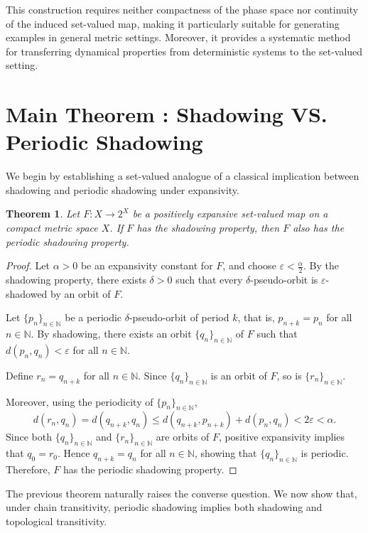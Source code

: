 \documentclass{amsart}
\newtheorem{theorem}{Theorem}[section]
\theoremstyle{definition}
\begin{document}
This construction requires neither compactness of the phase space nor continuity of the induced set-valued map, making it particularly suitable for generating examples in general metric settings. Moreover, it provides a systematic method for transferring dynamical properties from deterministic systems to the set-valued setting.



\section{Main Theorem : Shadowing VS. Periodic Shadowing}

We begin by establishing a set-valued analogue of a classical implication between shadowing and periodic shadowing under expansivity.

\begin{theorem}    
\label{theoremA}
Let $F:X\to 2^X$ be a positively expansive set-valued map on a compact metric space $X$. If $F$ has the shadowing property, then $F$ also has the periodic shadowing property.
\end{theorem}

\begin{proof}
Let $\alpha>0$ be an expansivity constant for $F$, and choose $\varepsilon<\frac{\alpha}{2}$. By the shadowing property, there exists $\delta>0$ such that every $\delta$-pseudo-orbit is $\varepsilon$-shadowed by an orbit of $F$.

Let $\{p_n\}_{n\in\mathbb N}$ be a periodic $\delta$-pseudo-orbit of period $k$, that is, $p_{n+k}=p_n$ for all $n\in\mathbb N$. 
By shadowing, there exists an orbit $\{q_n\}_{n\in\mathbb N}$ of $F$ such that $
d(p_n,q_n)<\varepsilon$ for all $n\in\mathbb N$.

Define $r_n=q_{n+k}$ for all $n\in\mathbb N$. Since $\{q_n\}_{n\in\mathbb N}$ is an orbit of $F$, so is $\{r_n\}_{n\in\mathbb N}$. 

Moreover, using the periodicity of $\{p_n\}_{n\in\mathbb N}$,
\[ d(r_n,q_n)
=
d(q_{n+k},q_n) \leq
d(q_{n+k},p_{n+k})
+
d(p_n,q_n)
<
2\varepsilon
<
\alpha.
\]
Since both $\{q_n\}_{n\in\mathbb N}$ and $\{r_n\}_{n\in\mathbb N}$ are orbits of $F$, positive expansivity implies that $q_0=r_0$. Hence $q_{n+k}=q_n$ for all $n\in\mathbb N$, showing that $\{q_n\}_{n\in\mathbb N}$ is periodic. Therefore, $F$ has the periodic shadowing property.
\end{proof}

The previous theorem naturally raises the converse question. We now show that, under chain transitivity, periodic shadowing implies both shadowing and topological transitivity.
\end{document}
